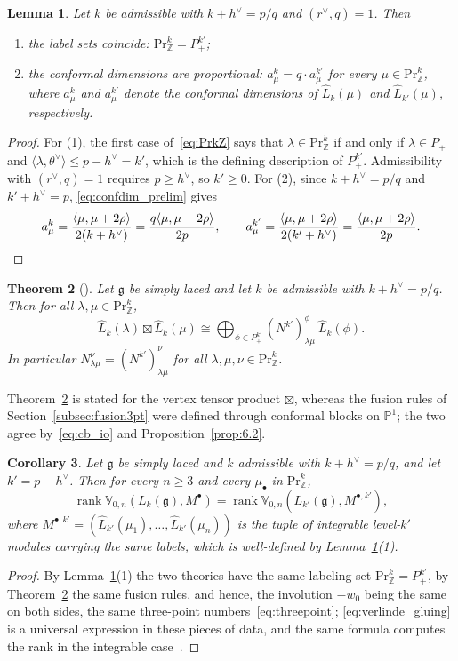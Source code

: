 \documentclass[12pt,a4paper,reqno]{amsart}
\numberwithin{equation}{section}
\newtheorem{theorem}{Theorem}[section]
\newtheorem{lemma}[theorem]{Lemma}
\newtheorem{corollary}[theorem]{Corollary}
\theoremstyle{definition}
\newcommand{\g}{\mathfrak{g}}
\newcommand{\rk}{\operatorname{rank}}
\newcommand{\Z}{\mathbb{Z}}
\renewcommand{\P}{\mathbb{P}}
\def\Pr{\mathrm{Pr}}
\def\la{\lambda}
\def\<{\langle}
\def\>{\rangle}
\def\ds{\dots}
\def\VV{\mathbb{V}}
\begin{document}
\begin{lemma}\label{lm:comparison}
Let $k$ be admissible with $k+h^\vee=p/q$ and $(r^\vee,q)=1$. Then
\begin{enumerate}
\item the label sets coincide: $\Pr^k_\Z=P^{k'}_+$;
\item the conformal dimensions are proportional: $a^k_\mu=q\cdot a^{k'}_\mu$ for every $\mu\in \Pr^k_\Z$, where $a^k_\mu$ and $a^{k'}_\mu$ denote the conformal dimensions of $\hat{L}_k(\mu)$ and $\hat{L}_{k'}(\mu)$, respectively.
\end{enumerate}
\end{lemma}
\begin{proof}
For (1), the first case of~\eqref{eq:PrkZ} says that $\la\in\Pr^k_\Z$ if and only if $\la\in P_+$ and $\<\la,\theta^\vee\>\leq p-h^\vee=k'$, which is the defining description of $P^{k'}_+$. Admissibility with $(r^\vee,q)=1$ requires $p\geq h^\vee$, so $k'\geq 0$. For (2), since $k+h^\vee=p/q$ and $k'+h^\vee=p$, \eqref{eq:confdim_prelim} gives
\[
a^k_\mu=\frac{\<\mu,\mu+2\rho\>}{2(k+h^\vee)}=\frac{q\<\mu,\mu+2\rho\>}{2p},\qquad a^{k'}_\mu=\frac{\<\mu,\mu+2\rho\>}{2(k'+h^\vee)}=\frac{\<\mu,\mu+2\rho\>}{2p}. \qedhere
\]
\end{proof}

\begin{theorem}[{\cite[Corollary 7.4]{Creutzig19}}]\label{thm:creutzig_fusion}
Let $\g$ be simply laced and let $k$ be admissible with $k+h^\vee=p/q$. Then for all $\la,\mu\in \Pr^k_\Z$,
\[
\hat{L}_k(\la)\boxtimes \hat{L}_k(\mu)\cong \bigoplus_{\phi\in P^{k'}_+} \left(N^{k'}\right)_{\la\mu}^{\phi}\ \hat{L}_k(\phi).
\]
In particular $N_{\la\mu}^{\nu}=\left(N^{k'}\right)_{\la\mu}^{\nu}$ for all $\la,\mu,\nu\in \Pr^k_\Z$.
\end{theorem}

Theorem~\ref{thm:creutzig_fusion} is stated for the vertex tensor product $\boxtimes$, whereas the fusion rules of Section~\ref{subsec:fusion3pt} were defined through conformal blocks on $\P^1$; the two agree by~\eqref{eq:cb_io} and Proposition~\ref{prop:6.2}.

\begin{corollary}\label{coro:rank_integrable}
Let $\g$ be simply laced and $k$ admissible with $k+h^\vee=p/q$, and let $k'=p-h^\vee$. Then for every $n\geq 3$ and every $\mu_\bullet$ in $\Pr^k_\Z$,
\[
\rk \VV_{0,n}(L_k(\g),M^\bullet)=\rk \VV_{0,n}(L_{k'}(\g),M^{\bullet,k'}),
\]
where $M^{\bullet,k'}=(\hat{L}_{k'}(\mu_1),\ds,\hat{L}_{k'}(\mu_n))$ is the tuple of integrable level-$k'$ modules carrying the same labels, which is well-defined by Lemma~\ref{lm:comparison}(1).
\end{corollary}
\begin{proof}
By Lemma~\ref{lm:comparison}(1) the two theories have the same labeling set $\Pr^k_\Z=P^{k'}_+$, by Theorem~\ref{thm:creutzig_fusion} the same fusion rules, and hence, the involution $-w_0$ being the same on both sides, the same three-point numbers~\eqref{eq:threepoint}; \eqref{eq:verlinde_gluing} is a universal expression in these pieces of data, and the same formula computes the rank in the integrable case~\cite{TUY}.
\end{proof}
\end{document}
